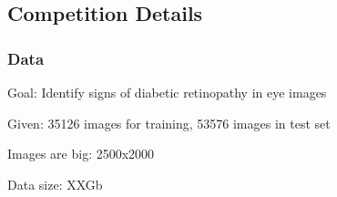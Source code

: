 \documentclass{beamer}
\begin{document}
\subsection{Competition Details}
\begin{frame}\frametitle{Data} 
\par Goal: Identify signs of diabetic retinopathy in eye images
\par Given: 35126 images for training, 53576 images in test set
\par Images are big: 2500x2000
\par Data size: XXGb


\setlength\tabcolsep{0pt}
\renewcommand{\arraystretch}{0.1}

\begin{tabular}{|C{0.2\textwidth}|C{0.2\textwidth}|C{0.2\textwidth}|C{0.2\textwidth}|C{0.2\textwidth}|}
\hline


\end{tabular}
\end{frame}
\end{document}

